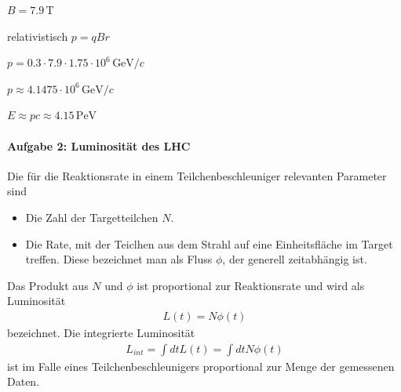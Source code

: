 \documentclass[11pt,a4paper]{scrartcl}
\begin{document}
\begin{enumerate}[label=(\alph*)]
\begin{calculationbox}
        $B = 7.9\,\text{T}$

        relativistisch $p = qBr$

        $p = 0.3 \cdot 7.9 \cdot 1.75 \cdot 10^6\,\text{GeV}/c$

        $p \approx 4.1475 \cdot 10^6\,\text{GeV}/c$

        $E \approx pc \approx 4.15\,\text{PeV}$
    \end{calculationbox}
\end{enumerate}


\paragraph{Aufgabe 2: Luminosität des LHC}

Die für die Reaktionsrate in einem Teilchenbeschleuniger relevanten Parameter sind
\begin{itemize}
    \item Die Zahl der Targetteilchen $N$.
    \item Die Rate, mit der Teiclhen aus dem Strahl auf eine Einheitsfläche im Target treffen. Diese bezeichnet man als Fluss $\phi$, der generell zeitabhängig ist.
\end{itemize}
Das Produkt aus $N$ und $\phi$ ist proportional zur Reaktionsrate und wird als Luminosität
\begin{align*}
    L(t) = N \phi(t)
\end{align*}
bezeichnet. Die integrierte Luminosität
\begin{align*}
    L_{int} = \int dt\!L(t) = \int dt\! N \phi(t)
\end{align*}
ist im Falle eines Teilchenbeschleunigers proportional zur Menge der gemessenen Daten.
\end{document}
